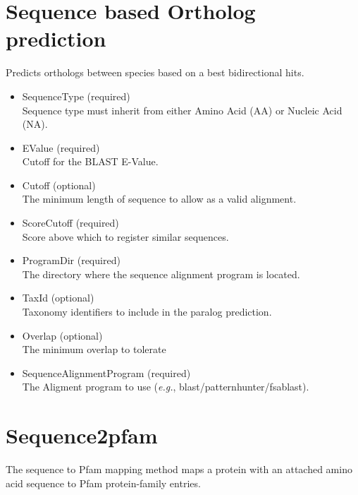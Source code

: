     
\section{Sequence based Ortholog prediction}
Predicts orthologs between species based on a best bidirectional hits.

\begin{itemize}
  
  \item{SequenceType (required)}\\
  Sequence type must inherit from either Amino Acid (AA) or Nucleic Acid (NA).
  
  \item{EValue (required)}\\
  Cutoff for the BLAST E-Value.
  
  \item{Cutoff (optional)}\\
  The minimum length of sequence to allow as a valid alignment.
  
  \item{ScoreCutoff (required)}\\
  Score above which to register similar sequences.
  
  \item{ProgramDir (required)}\\
  The directory where the sequence alignment program is located.
  
  \item{TaxId (optional)}\\
  Taxonomy identifiers to include in the paralog prediction.
  
  \item{Overlap (optional)}\\
  The minimum overlap to tolerate
  
  \item{SequenceAlignmentProgram (required)}\\
  The Aligment program to use ({\it{e.g.}}, blast/patternhunter/fsablast).

\end{itemize}
    
    
\section{Sequence2pfam}
The sequence to Pfam mapping method maps a protein with an attached amino acid sequence to Pfam protein-family entries.  

